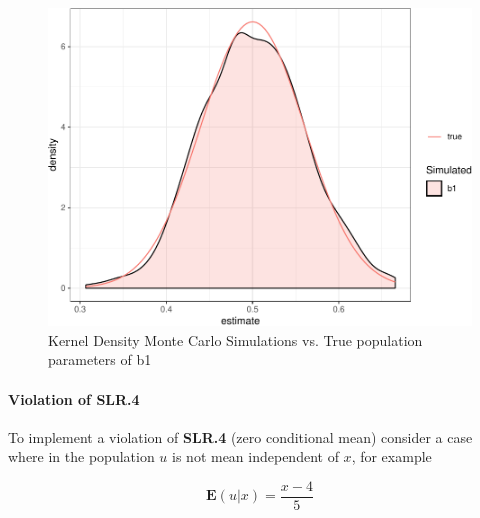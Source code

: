 \documentclass[]{book}
\let\oldparagraph\paragraph
\renewcommand{\paragraph}[1]{\oldparagraph{#1}\mbox{}}
\begin{document}
\begin{figure}

{\centering \includegraphics[width=0.8\linewidth]{MEM5220_R_files/figure-latex/fig9-1} 

}

\caption{Kernel Density Monte Carlo Simulations vs. True population parameters of b1}\label{fig:fig9}
\end{figure}

\hypertarget{violation-of-slr.4}{%
\paragraph{Violation of SLR.4}\label{violation-of-slr.4}}

To implement a violation of \textbf{SLR.4} (zero conditional mean) consider a case where in the population \(u\) is not mean independent of \(x\), for example

\[
\mathbf{E}(u|x) = \frac{x-4}{5}
\]
\end{document}
